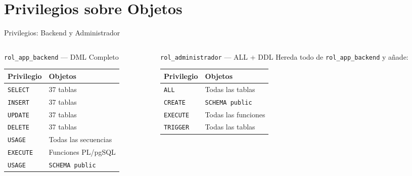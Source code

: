 \documentclass[aspectratio=169]{beamer}
\begin{document}
\section{Privilegios sobre Objetos}

\begin{frame}{Privilegios: Backend y Administrador}
    \begin{columns}[T]
        \begin{column}{0.48\textwidth}
            \begin{block}{\texttt{rol\_app\_backend} --- DML Completo}
                \scriptsize
                \begin{tabular}{ll}
                    \toprule
                    \textbf{Privilegio} & \textbf{Objetos} \\
                    \midrule
                    \texttt{SELECT} & 37 tablas \\
                    \texttt{INSERT} & 37 tablas \\
                    \texttt{UPDATE} & 37 tablas \\
                    \texttt{DELETE} & 37 tablas \\
                    \texttt{USAGE} & Todas las secuencias \\
                    \texttt{EXECUTE} & Funciones PL/pgSQL \\
                    \texttt{USAGE} & \texttt{SCHEMA public} \\
                    \bottomrule
                \end{tabular}
            \end{block}
        \end{column}
        \begin{column}{0.48\textwidth}
            \begin{block}{\texttt{rol\_administrador} --- ALL + DDL}
                \scriptsize
                Hereda todo de \texttt{rol\_app\_backend} y añade:
                \begin{tabular}{ll}
                    \toprule
                    \textbf{Privilegio} & \textbf{Objetos} \\
                    \midrule
                    \texttt{ALL} & Todas las tablas \\
                    \texttt{CREATE} & \texttt{SCHEMA public} \\
                    \texttt{EXECUTE} & Todas las funciones \\
                    \texttt{TRIGGER} & Todas las tablas \\
                    \bottomrule
                \end{tabular}
            \end{block}
        \end{column}
    \end{columns}
\end{frame}
\end{document}
